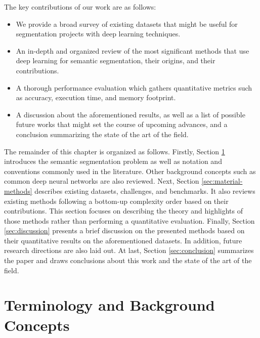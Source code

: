 The key contributions of our work are as follows:

\begin{itemize}
	\item We provide a broad survey of existing datasets that might be useful for segmentation projects with deep learning techniques.
	\item An in-depth and organized review of the most significant methods that use deep learning for semantic segmentation, their origins, and their contributions.
	\item A thorough performance evaluation which gathers quantitative metrics such as accuracy, execution time, and memory footprint.
	\item A discussion about the aforementioned results, as well as a list of possible future works that might set the course of upcoming advances, and a conclusion summarizing the state of the art of the field.
\end{itemize}

The remainder of this chapter is organized as follows. Firstly, Section \ref{sec:background} introduces the semantic segmentation problem as well as notation and conventions commonly used in the literature. Other background concepts such as common deep neural networks are also reviewed.  Next, Section \ref{sec:material-methods} describes existing datasets, challenges, and benchmarks. It also reviews existing methods following a bottom-up complexity order based on their contributions. This section focuses on describing the theory and highlights of those methods rather than performing a quantitative evaluation. Finally, Section \ref{sec:discussion} presents a brief discussion on the presented methods based on their quantitative results on the aforementioned datasets. In addition, future research directions are also laid out. At last, Section \ref{sec:conclusion} summarizes the paper and draws conclusions about this work and the state of the art of the field.

\section{Terminology and Background Concepts}
\label{sec:background}


